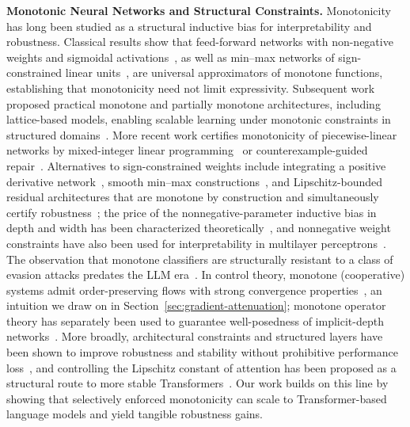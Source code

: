 \documentclass{article}
\theoremstyle{plain}
\theoremstyle{definition}
\theoremstyle{remark}
\begin{document}
\textbf{Monotonic Neural Networks and Structural Constraints.}
Monotonicity has long been studied as a structural inductive bias for interpretability and robustness. Classical results show that feed-forward networks with non-negative weights and sigmoidal activations~\citep{Daniels2010Monotone}, as well as min--max networks of sign-constrained linear units~\citep{Sill1998MonotonicNetworks}, are universal approximators of monotone functions, establishing that monotonicity need not limit expressivity. Subsequent work proposed practical monotone and partially monotone architectures, including lattice-based models, enabling scalable learning under monotonic constraints in structured domains~\citep{Gupta2016MonotonicLattices,You2017DeepLattice}. More recent work certifies monotonicity of piecewise-linear networks by mixed-integer linear programming~\citep{liu2020certified} or counterexample-guided repair~\citep{sivaraman2020counterexample}.
Alternatives to sign-constrained weights include integrating a positive derivative network~\citep{wehenkel2019unconstrained}, smooth min--max constructions~\citep{igel2024smooth}, and Lipschitz-bounded residual architectures that are monotone by construction and simultaneously certify robustness~\citep{nolte2023expressive,kitouni2023robust}; the price of the nonnegative-parameter inductive bias in depth and width has been characterized theoretically~\citep{mikulincer2022size}, and nonnegative weight constraints have also been used for interpretability in multilayer perceptrons~\citep{chorowski2015learning}. The observation that monotone classifiers are structurally resistant to a class of evasion attacks predates the LLM era~\citep{incer2018adversarially}. In control theory, monotone (cooperative) systems admit order-preserving flows with strong convergence properties~\citep{hirsch2006monotone,angeli2003monotone}, an intuition we draw on in Section~\ref{sec:gradient-attenuation}; monotone operator theory has separately been used to guarantee well-posedness of implicit-depth networks~\citep{winston2020monotone}. More broadly, architectural constraints and structured layers have been shown to improve robustness and stability without prohibitive performance loss~\citep{Amos2017OptNet}, and controlling the Lipschitz constant of attention has been proposed as a structural route to more stable Transformers~\citep{kim2021lipschitz,newhouse2025training}. Our work builds on this line by showing that selectively enforced monotonicity can scale to Transformer-based language models and yield tangible robustness gains.
\end{document}
